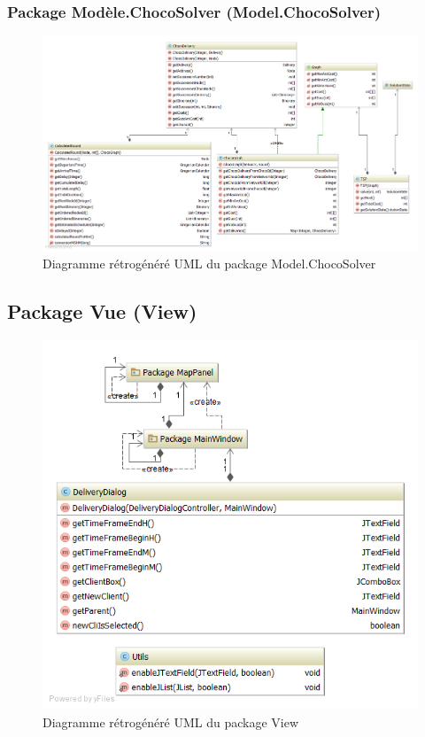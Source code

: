 \begin{landscape}
\subsubsection{Package Mod\`ele.ChocoSolver (Model.ChocoSolver)}

\begin{figure}[h]
    \centering
    \includegraphics[width=200mm]{../diagrams/classes_packages/final_classes_packages/model/chocoSolver.png}
    \caption{Diagramme r\'etrog\'en\'er\'e UML du package Model.ChocoSolver}
    \label{diagram:gen_uml_model_choco}
\end{figure}
\end{landscape}
\pagebreak

\subsection{Package Vue (View)}

\begin{figure}[h]
    \centering
    \includegraphics[width=120mm]{../diagrams/classes_packages/final_classes_packages/view/view.png}
    \caption{Diagramme r\'etrog\'en\'er\'e UML du package View}
    \label{diagram:gen_uml_view}
\end{figure}
\pagebreak

